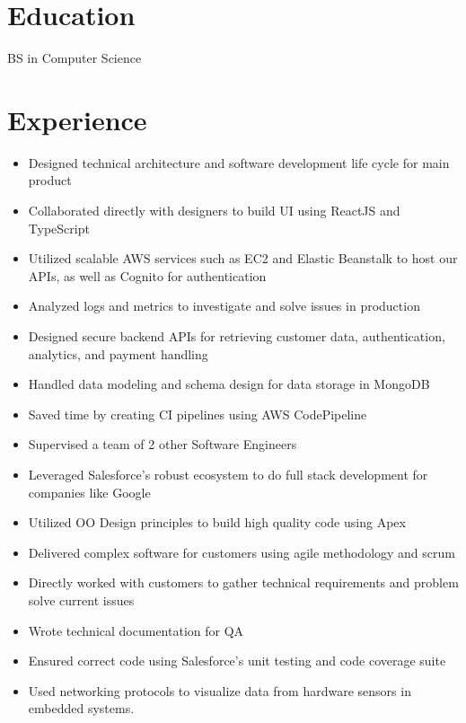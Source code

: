 \documentclass{cv}
\begin{document}
	\section{Education}
	BS in Computer Science

	\section{Experience}
	\begin{itemize}
		\item Designed technical architecture and software development life cycle for main product
		\item Collaborated directly with designers to build UI using ReactJS and TypeScript
		\item Utilized scalable AWS services such as EC2 and Elastic Beanstalk to host our APIs, as well as Cognito for authentication
		\item Analyzed logs and metrics to investigate and solve issues in production
		\item Designed secure backend APIs for retrieving customer data, authentication, analytics, and payment handling
		\item Handled data modeling and schema design for data storage in MongoDB
		\item Saved time by creating CI pipelines using AWS CodePipeline
		\item Supervised a team of 2 other Software Engineers
	\end{itemize}

	\begin{itemize}
		\item Leveraged Salesforce's robust ecosystem to do full stack development for companies like Google
		\item Utilized OO Design principles to build high quality code using Apex
		\item Delivered complex software for customers using agile methodology and scrum
		\item Directly worked with customers to gather technical requirements and problem solve current issues
		\item Wrote technical documentation for QA
		\item Ensured correct code using Salesforce's unit testing and code coverage suite
	\end{itemize}
	\begin{itemize}
		\item Used networking protocols to visualize data from hardware sensors in embedded systems.
	\end{itemize}
\end{document}
